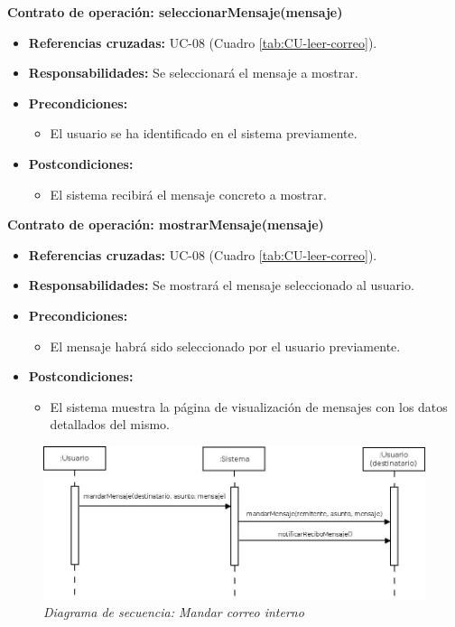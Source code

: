 \textbf{Contrato de operación: seleccionarMensaje(mensaje)}
\begin{itemize}
\item \textbf{Referencias cruzadas:} UC-08 (Cuadro \ref{tab:CU-leer-correo}).
\item \textbf{Responsabilidades:} Se seleccionará el mensaje a mostrar.
\item \textbf{Precondiciones:} 
 \begin{itemize}
\item El usuario se ha identificado en el sistema previamente.
\end {itemize}
\item \textbf{Postcondiciones:} 
 \begin{itemize}
\item El sistema recibirá el mensaje concreto a mostrar.
\end {itemize}
\end {itemize}

\textbf{Contrato de operación: mostrarMensaje(mensaje)}
\begin{itemize}
\item \textbf{Referencias cruzadas:} UC-08 (Cuadro \ref{tab:CU-leer-correo}).
\item \textbf{Responsabilidades:} Se mostrará el mensaje seleccionado al usuario.
\item \textbf{Precondiciones:} 
 \begin{itemize}
\item El mensaje habrá sido seleccionado por el usuario previamente.
\end {itemize}
\item \textbf{Postcondiciones:} 
 \begin{itemize}
\item El sistema muestra la página de visualización de mensajes con los datos detallados del mismo.
\end {itemize}
\end {itemize}


\vspace{10mm}

\begin{figure}[H]
\centering
  \includegraphics[scale=.45]{img/secuencias/gestion-servicios-mandar-correo.jpeg}
  \caption{\textit{Diagrama de secuencia: Mandar correo interno}}
  \label{fig:secuencia-gestion-servicios-mandar-correo}
\end{figure}

